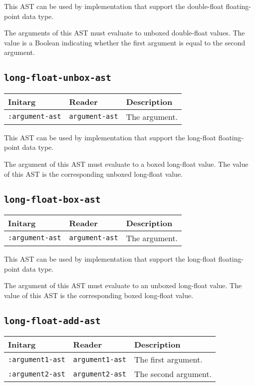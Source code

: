 This AST can be used by implementation that support the double-float
floating-point data type.  

The arguments of this AST must evaluate to unboxed double-float
values.  The value is a Boolean indicating whether the first argument
is equal to the second argument.

\subsection{\texttt{long-float-unbox-ast}}
\label{sec-ast-long-float-unbox}

\begin{tabular}{|l|l|l|}
\hline
Initarg & Reader & Description\\
\hline\hline
\texttt{:argument-ast} & \texttt{argument-ast} & The argument.\\
\hline
\end{tabular}

This AST can be used by implementation that support the long-float
floating-point data type.  

The argument of this AST must evaluate to a boxed long-float value.
The value of this AST is the corresponding unboxed long-float value.

\subsection{\texttt{long-float-box-ast}}
\label{sec-ast-long-float-box}

\begin{tabular}{|l|l|l|}
\hline
Initarg & Reader & Description\\
\hline\hline
\texttt{:argument-ast} & \texttt{argument-ast} & The argument.\\
\hline
\end{tabular}

This AST can be used by implementation that support the long-float
floating-point data type.  

The argument of this AST must evaluate to an unboxed long-float
value.  The value of this AST is the corresponding boxed long-float
value.

\subsection{\texttt{long-float-add-ast}}
\label{sec-ast-long-float-add}

\begin{tabular}{|l|l|l|}
\hline
Initarg & Reader & Description\\
\hline\hline
\texttt{:argument1-ast} & \texttt{argument1-ast} & The first argument.\\
\hline
\texttt{:argument2-ast} & \texttt{argument2-ast} & The second argument.\\
\hline
\end{tabular}

